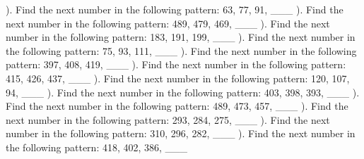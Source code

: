 \documentclass{article}%
\begin{document}
\newline%
). Find the next number in the following pattern: 63, 77, 91, \_\_\_%
\newline%
\newline%
). Find the next number in the following pattern: 489, 479, 469, \_\_\_%
\newline%
\newline%
). Find the next number in the following pattern: 183, 191, 199, \_\_\_%
\newline%
\newline%
). Find the next number in the following pattern: 75, 93, 111, \_\_\_%
\newline%
\newline%
). Find the next number in the following pattern: 397, 408, 419, \_\_\_%
\newline%
\newline%
). Find the next number in the following pattern: 415, 426, 437, \_\_\_%
\newline%
\newline%
). Find the next number in the following pattern: 120, 107, 94, \_\_\_%
\newline%
\newline%
). Find the next number in the following pattern: 403, 398, 393, \_\_\_%
\newline%
\newline%
). Find the next number in the following pattern: 489, 473, 457, \_\_\_%
\newline%
\newline%
). Find the next number in the following pattern: 293, 284, 275, \_\_\_%
\newline%
\newline%
). Find the next number in the following pattern: 310, 296, 282, \_\_\_%
\newline%
\newline%
). Find the next number in the following pattern: 418, 402, 386, \_\_\_%
\end{document}
